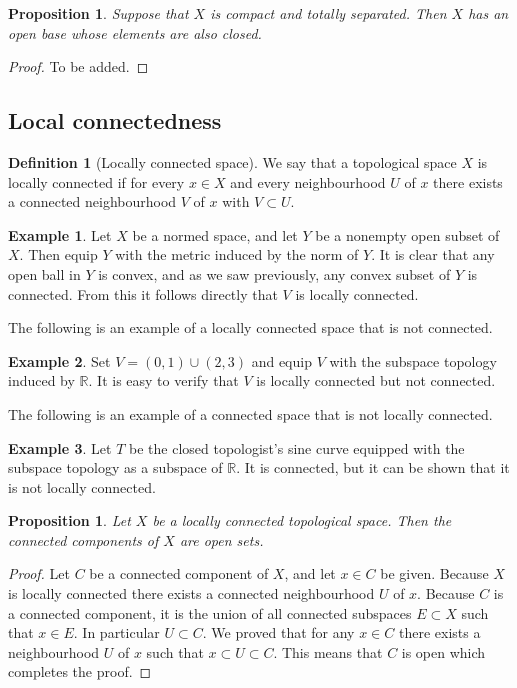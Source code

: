 \documentclass[11pt,a4paper]{article}
\theoremstyle{definition}
\newtheorem{definition}{Definition}[section]
\newtheorem{example}{Example}[section]
\theoremstyle{plain}
\newtheorem{proposition}[theorem]{Proposition}
\newcommand{\R}{\mathbb{R}}
\begin{document}
  \begin{proposition}
    Suppose that $X$ is compact and totally separated.
    Then $X$ has an open base whose elements are also closed.
  \end{proposition}
  \begin{proof}
    To be added.
  \end{proof}
  
  \subsection{Local connectedness}

  \begin{definition}[Locally connected space]
    We say that a topological space $X$ is locally connected if for every
    $x \in X$ and every neighbourhood $U$ of $x$ there exists a connected
    neighbourhood $V$ of $x$ with $V \subset U$.
  \end{definition}

  \begin{example}
    Let $X$ be a normed space, and let $Y$ be a nonempty open subset of
    $X$. Then equip $Y$ with the metric induced by the norm of $Y$.
    It is clear that any open ball in $Y$ is convex, and as we saw
    previously, any convex subset of $Y$ is connected.
    From this it follows directly that $V$ is locally connected.
  \end{example}

  The following is an example of a locally connected space that is not
  connected.

  \begin{example}
    Set $V = (0, 1) \cup (2, 3)$ and equip $V$ with the subspace topology
    induced by $\R$.
    It is easy to verify that $V$ is locally connected but not connected.
  \end{example}

  The following is an example of a connected space that is not locally 
  connected.

  \begin{example}
    Let $T$ be the closed topologist's sine curve equipped with the subspace
    topology as a subspace of $\R$. It is connected, but it can be shown that
    it is not locally connected.
  \end{example}

  \begin{proposition}
    Let $X$ be a locally connected topological space.
    Then the connected components of $X$ are open sets.
  \end{proposition}
  \begin{proof}
    Let $C$ be a connected component of $X$, and let $x \in C$ be given.
    Because $X$ is locally connected there exists a connected neighbourhood
    $U$ of $x$.
    Because $C$ is a connected component, it is the union of all connected
    subspaces $E \subset X$ such that $x \in E$.
    In particular $U \subset C$.
    We proved that for any $x \in C$ there exists a neighbourhood $U$ of
    $x$ such that $x \subset U \subset C$.
    This means that $C$ is open which completes the proof.
\end{proof}
\end{document}
